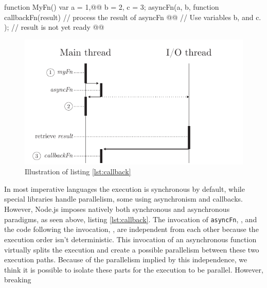 \begin{code}[Javascript, caption={Example of an asynchronous function call},label={lst:callback}]
function MyFn() { 
  var a = 1,@@
      b = 2,
      c = 3;
  asyncFn(a, b, function callbackFn(result) {
    // process the result of asyncFn @@
    // Use variables b, and c.
  });
  // result is not yet ready @@
}
\end{code}

\begin{figure}[h!]
  \includegraphics[width=\linewidth]{callback.pdf}
  \caption{Illustration of listing \ref{lst:callback}}
  \label{fig:callback}
\end{figure}

In most imperative languages the execution is synchronous by default, while special libraries handle parallelism, some using asynchronism and callbacks\cite{Liskov1988}.
However, Node.js imposes natively both synchronous and asynchronous paradigms, as seen above, listing \ref{lst:callback}.
The invocation of \texttt{asyncFn}, , and the code following the invocation, , are independent from each other because the execution order isn't deterministic.
This invocation of an asynchronous function virtually splits the execution and create a possible parallelism between these two execution paths.
Because of the parallelism implied by this independence, we think it is possible to isolate these parts for the execution to be parallel.
However, breaking




